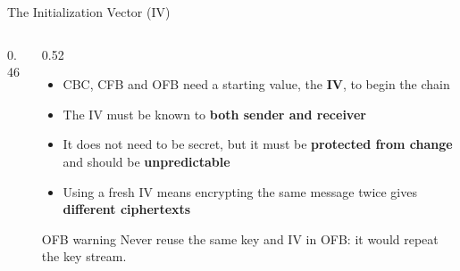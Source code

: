 \documentclass[aspectratio=169,11pt,xcolor={table}]{beamer}
\begin{document}
\begin{frame}{The Initialization Vector (IV)}
  \begin{columns}[c]
    \begin{column}{0.46\textwidth}
      \centering
    \end{column}
    \begin{column}{0.52\textwidth}
      \begin{itemize}\small\setlength{\itemsep}{4pt}
        \item CBC, CFB and OFB need a starting value, the \textbf{IV}, to begin the chain
        \item The IV must be known to \textbf{both sender and receiver}
        \item It does not need to be secret, but it must be \textbf{protected from change} and should be \textbf{unpredictable}
        \item Using a fresh IV means encrypting the same message twice gives \textbf{different ciphertexts}
      \end{itemize}
      \begin{alertblock}{OFB warning}
        \small Never reuse the same key and IV in OFB: it would repeat the key stream.
      \end{alertblock}
    \end{column}
  \end{columns}
\end{frame}
\end{document}
